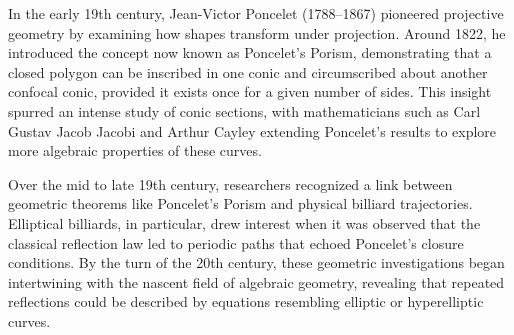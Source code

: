 \begin{historical}
In the early 19th century, Jean-Victor Poncelet (1788–1867) pioneered projective geometry by examining how shapes transform under projection. Around 1822, he introduced the concept now known as Poncelet’s Porism, demonstrating that a closed polygon can be inscribed in one conic and circumscribed about another confocal conic, provided it exists once for a given number of sides. This insight spurred an intense study of conic sections, with mathematicians such as Carl Gustav Jacob Jacobi and Arthur Cayley extending Poncelet’s results to explore more algebraic properties of these curves.

Over the mid to late 19th century, researchers recognized a link between geometric theorems like Poncelet’s Porism and physical billiard trajectories. Elliptical billiards, in particular, drew interest when it was observed that the classical reflection law led to periodic paths that echoed Poncelet’s closure conditions. By the turn of the 20th century, these geometric investigations began intertwining with the nascent field of algebraic geometry, revealing that repeated reflections could be described by equations resembling elliptic or hyperelliptic curves.


\end{historical}